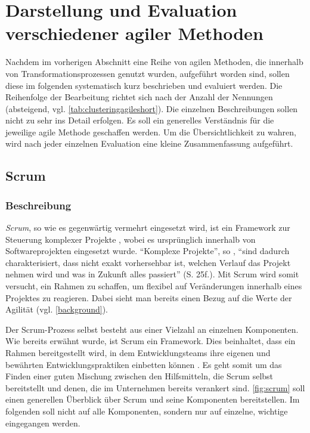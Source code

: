 \section{Darstellung und Evaluation verschiedener agiler Methoden}


Nachdem im vorherigen Abschnitt eine Reihe von agilen Methoden, die innerhalb von Transformationsprozessen genutzt wurden, aufgeführt worden sind, sollen diese im folgenden systematisch kurz beschrieben und evaluiert werden. Die Reihenfolge der Bearbeitung richtet sich nach der Anzahl der Nennungen (absteigend, vgl. \ref{tab:clusteringagileshort}). Die einzelnen Beschreibungen sollen nicht zu sehr ins Detail erfolgen. Es soll ein generelles Verständnis für die jeweilige agile Methode geschaffen werden. Um die Übersichtlichkeit zu wahren, wird nach jeder einzelnen Evaluation eine kleine Zusammenfassung aufgeführt.

\subsection{Scrum}

\subsubsection{Beschreibung}

\textit{Scrum}, so wie es gegenwärtig vermehrt eingesetzt wird, ist ein Framework zur Steuerung komplexer Projekte \cite[S. 25]{wirdemann_scrum_2017}, wobei es ursprünglich innerhalb von Softwareprojekten eingesetzt wurde. ``Komplexe Projekte'', so , ``sind
dadurch charakterisiert, dass nicht exakt vorhersehbar ist, welchen Verlauf das Projekt nehmen wird und was in Zukunft alles passiert'' (S. 25f.). Mit Scrum wird somit versucht, ein Rahmen zu schaffen, um flexibel auf Veränderungen innerhalb eines Projektes zu reagieren. Dabei sieht man bereits einen Bezug auf die Werte der Agilität (vgl. \ref{background}).

Der Scrum-Prozess selbst besteht aus einer Vielzahl an einzelnen Komponenten. Wie bereits erwähnt wurde, ist Scrum ein Framework. Dies beinhaltet, dass ein Rahmen bereitgestellt wird, in dem Entwicklungsteams ihre eigenen und bewährten Entwicklungspraktiken einbetten können \cite[S. 27]{wirdemann_scrum_2017}. Es geht somit um das Finden einer guten Mischung zwischen den Hilfsmitteln, die Scrum selbst bereitstellt und denen, die im Unternehmen bereits verankert sind. \ref{fig:scrum} soll einen generellen Überblick über Scrum und seine Komponenten bereitstellen. Im folgenden soll nicht auf alle Komponenten, sondern nur auf einzelne, wichtige eingegangen werden.

